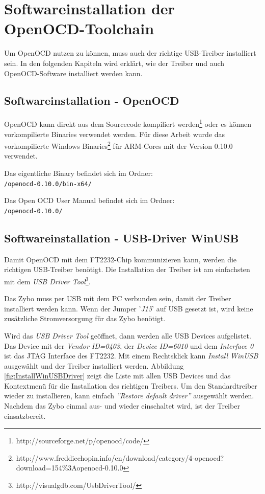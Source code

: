 \section{Softwareinstallation der OpenOCD-Toolchain}
\label{kapitel:SoftwareinstallationOpenOCDToolchain}
Um OpenOCD nutzen zu können, muss auch der richtige USB-Treiber installiert sein.
In den folgenden Kapiteln wird erklärt, wie der Treiber und auch OpenOCD-Software installiert werden kann.


\subsection{Softwareinstallation - OpenOCD}
OpenOCD kann direkt aus dem Sourcecode kompiliert werden\footnote{http://sourceforge.net/p/openocd/code/} oder es können vorkompilierte Binaries verwendet werden.
Für diese Arbeit wurde das vorkompilierte Windows Binaries\footnote{http://www.freddiechopin.info/en/download/category/4-openocd?download=154\%3Aopenocd-0.10.0} für ARM-Cores mit der Version 0.10.0 verwendet.

Das eigentliche Binary befindet sich im Ordner:\\
\texttt{/openocd-0.10.0/bin-x64/} 

Das Open OCD User Manual\cite{bib:OpenOCDDoku} befindet sich im Ordner:\\
\texttt{/openocd-0.10.0/} 


\subsection{Softwareinstallation - USB-Driver WinUSB}
\label{kapitel:usbTreiber}
Damit OpenOCD mit dem FT2232-Chip kommunizieren kann, werden die richtigen USB-Treiber benötigt.
Die Installation der Treiber ist am einfachsten mit dem \textit{USB Driver Tool}\footnote{http://visualgdb.com/UsbDriverTool/}.

Das Zybo muss per USB mit dem PC verbunden sein, damit der Treiber installiert werden kann.
Wenn der Jumper '\textit{J15}' auf USB gesetzt ist, wird keine zusätzliche Stromversorgung für das Zybo benötigt.

Wird das \textit{USB Driver Tool} geöffnet, dann werden alle USB Devices aufgelistet.
Das Device mit der \textit{Vendor ID=0403}, der \textit{Device ID=6010} und dem \textit{Interface 0} ist das JTAG Interface des FT2232.
Mit einem Rechtsklick kann \textit{Install WinUSB} ausgewählt und der Treiber installiert werden.
Abbildung \ref{fig:InstallWinUSBDriver} zeigt die Liste mit allen USB Devices und das Kontextmenü für die Installation des richtigen Treibers.
Um den Standardtreiber wieder zu installieren, kann einfach \textit{''Restore default driver''} ausgewählt werden.
Nachdem das Zybo einmal aus- und wieder einschaltet wird, ist der Treiber einsatzbereit.

